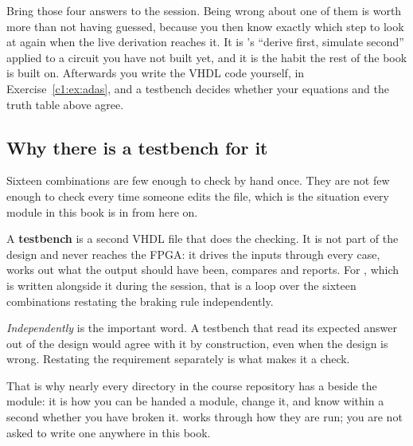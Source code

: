 Bring those four answers to the session. Being wrong about one of them is worth more than not
having guessed, because you then know exactly which step to look at again when the live derivation
reaches it. It is 's ``derive first, simulate second'' applied to a circuit you
have not built yet, and it is the habit the rest of the book is built on. Afterwards you write the
VHDL code yourself, in Exercise~\ref{c1:ex:adas}, and a testbench decides whether your equations and
the truth table above agree.

\subsection*{Why there is a testbench for it}
Sixteen combinations are few enough to check by hand once. They are not few enough to check every
time someone edits the file, which is the situation every module in this book is in from here on.

A \textbf{testbench} is a second VHDL file that does the checking. It is not part of the design and
never reaches the FPGA: it drives the inputs through every case, works out what the output should
have been, compares and reports. For , which is written alongside it during the session,
that is a loop over the sixteen combinations restating the braking rule independently.

\emph{Independently} is the important word. A testbench that read its expected answer out of the
design would agree with it by construction, even when the design is wrong. Restating the
requirement separately is what makes it a check.

That is why nearly every directory in the course repository has a  beside the module:
it is how you can be handed a module, change it, and know within a second whether you have broken
it.  works through how they are run; you are not asked to write one
anywhere in this book.
